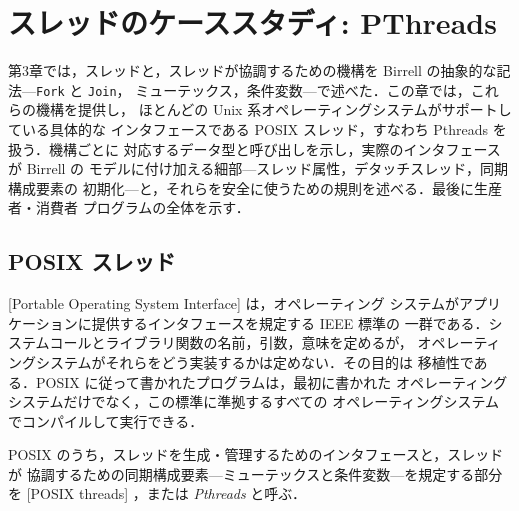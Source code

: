 \documentclass[../main.tex]{subfiles}
\begin{document}
\chapter{スレッドのケーススタディ: PThreads}

第3章では，スレッドと，スレッドが協調するための機構を Birrell
\cite{birrell1989} の抽象的な記法---\texttt{Fork} と \texttt{Join}，
ミューテックス，条件変数---で述べた．この章では，これらの機構を提供し，
ほとんどの Unix 系オペレーティングシステムがサポートしている具体的な
インタフェースである POSIX スレッド，すなわち Pthreads を扱う．機構ごとに
対応するデータ型と呼び出しを示し，実際のインタフェースが Birrell の
モデルに付け加える細部---スレッド属性，デタッチスレッド，同期構成要素の
初期化---と，それらを安全に使うための規則を述べる．最後に生産者・消費者
プログラムの全体を示す．

\section{POSIX スレッド}
\label{sec:l04-posix}

[Portable Operating System Interface]%
 は，オペレーティング
システムがアプリケーションに提供するインタフェースを規定する IEEE 標準の
一群である．システムコールとライブラリ関数の名前，引数，意味を定めるが，
オペレーティングシステムがそれらをどう実装するかは定めない．その目的は
移植性である．POSIX に従って書かれたプログラムは，最初に書かれた
オペレーティングシステムだけでなく，この標準に準拠するすべての
オペレーティングシステムでコンパイルして実行できる．

\begin{definition}
  POSIX のうち，スレッドを生成・管理するためのインタフェースと，スレッドが
  協調するための同期構成要素---ミューテックスと条件変数---を規定する部分を
  [POSIX threads]%
  ，または \emph{Pthreads} と呼ぶ．
\end{definition}
\end{document}
